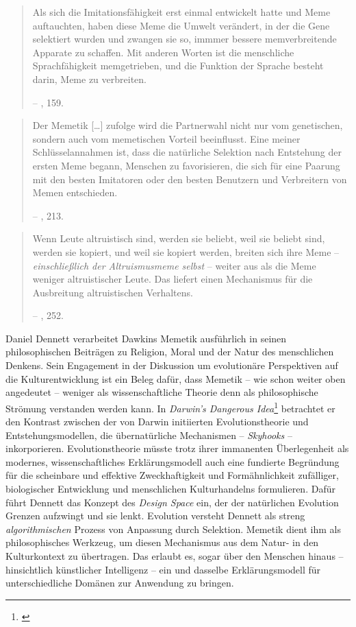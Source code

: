 \documentclass[openany,twoside,twocolumn]{book}
\let\rmarkdownfootnote\footnote%
\def\footnote{\protect\rmarkdownfootnote}
\begin{document}
\begin{quote}
Als sich die Imitationsfähigkeit erst einmal entwickelt hatte und Meme
auftauchten, haben diese Meme die Umwelt verändert, in der die Gene
selektiert wurden und zwangen sie so, immmer bessere memverbreitende
Apparate zu schaffen. Mit anderen Worten ist die menschliche
Sprachfähigkeit memgetrieben, und die Funktion der Sprache besteht
darin, Meme zu verbreiten.

-- \textcite{blackmore_macht_2000}, 159.
\end{quote}

\begin{quote}
Der Memetik {[}\ldots{}{]} zufolge wird die Partnerwahl nicht nur vom
genetischen, sondern auch vom memetischen Vorteil beeinflusst. Eine
meiner Schlüsselannahmen ist, dass die natürliche Selektion nach
Entstehung der ersten Meme begann, Menschen zu favorisieren, die sich
für eine Paarung mit den besten Imitatoren oder den besten Benutzern und
Verbreitern von Memen entschieden.

-- \textcite{blackmore_macht_2000}, 213.
\end{quote}

\begin{quote}
Wenn Leute altruistisch sind, werden sie beliebt, weil sie beliebt sind,
werden sie kopiert, und weil sie kopiert werden, breiten sich ihre Meme
-- \emph{einschließlich der Altruismusmeme selbst} -- weiter aus als die
Meme weniger altruistischer Leute. Das liefert einen Mechanismus für die
Ausbreitung altruistischen Verhaltens.

-- \textcite{blackmore_macht_2000}, 252.
\end{quote}

Daniel Dennett verarbeitet Dawkins Memetik ausführlich in seinen
philosophischen Beiträgen zu Religion, Moral und der Natur des
menschlichen Denkens. Sein Engagement in der Diskussion um evolutionäre
Perspektiven auf die Kulturentwicklung ist ein Beleg dafür, dass Memetik
-- wie schon weiter oben angedeutet -- weniger als wissenschaftliche
Theorie denn als philosophische Strömung verstanden werden kann. In
\emph{Darwin's Dangerous Idea}\footnote{\textcite{dennett_darwins_1995}}
betrachtet er den Kontrast zwischen der von Darwin initiierten
Evolutionstheorie und Entstehungsmodellen, die übernatürliche
Mechanismen -- \emph{Skyhooks} -- inkorporieren. Evolutionstheorie
müsste trotz ihrer immanenten Überlegenheit als modernes,
wissenschaftliches Erklärungsmodell auch eine fundierte Begründung für
die scheinbare und effektive Zweckhaftigkeit und Formähnlichkeit
zufälliger, biologischer Entwicklung und menschlichen Kulturhandelns
formulieren. Dafür führt Dennett das Konzept des \emph{Design Space}
ein, der der natürlichen Evolution Grenzen aufzwingt und sie lenkt.
Evolution versteht Dennett als streng \emph{algorithmischen} Prozess von
Anpassung durch Selektion. Memetik dient ihm als philosophisches
Werkzeug, um diesen Mechanismus aus dem Natur- in den Kulturkontext zu
übertragen. Das erlaubt es, sogar über den Menschen hinaus --
hinsichtlich künstlicher Intelligenz -- ein und dasselbe
Erklärungsmodell für unterschiedliche Domänen zur Anwendung zu bringen.
\end{document}

